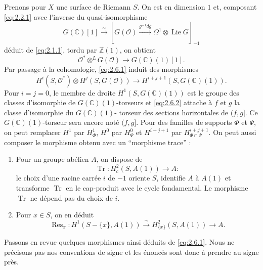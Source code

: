 \documentclass[12pt,a4paper]{article}
\theoremstyle{plain}
\theoremstyle{definition}
\theoremstyle{remark}
\DeclareMathOperator{\Res}{Res}
\DeclareMathOperator{\Tr}{Tr}
\newcommand{\cO}{\mathcal{O}}
\newcommand{\Z}{\mathbb{Z}}
\newcommand{\C}{\mathbb{C}}
\providecommand{\cO}{\mathcal{O}}
\providecommand{\Tr}{\operatorname{Tr}}
\begin{document}
Prenons pour $X$ une surface de Riemann $S$. On est en dimension $1$ et, composant \eqref{eq:2.2.1} avec l'inverse du quasi-isomorphisme
\[
G(\C)[1] \xrightarrow{\sim} [G(\cO) \xrightarrow{g^{-1}dg} \Omega^1 \otimes \operatorname{Lie} G]_{-1}
\]
déduit de \eqref{eq:2.1.1}, tordu par $\Z(1)$, on obtient
\begin{equation}\label{eq:2.6.1}
\cO^* \otimes^L G(\cO) \to G(\C)(1)[1].
\end{equation}
Par passage à la cohomologie, \eqref{eq:2.6.1} induit des morphismes
\begin{equation}\label{eq:2.6.2}
H^i(S, \cO^*) \otimes H^j(S, G(\cO)) \to H^{i+j+1}(S, G(\C)(1)).
\end{equation}
Pour $i = j = 0$, le membre de droite $H^1(S, G(\C)(1))$ est le groupe des classes d'isomorphie
de $G(\C)(1)$-torseurs et \eqref{eq:2.6.2} attache à $f$ et $g$ la classe d'isomorphie du $G(\C)(1)$-
torseur des sections horizontales de $(f,g]$. Ce $G(\C)(1)$-torseur sera encore noté $(f,g]$.
Pour des familles de supports $\Phi$ et $\Psi$, on peut remplacer $H^1$ par $H^1_\Phi$, $H^0$ par $H^0_\Psi$
et $H^{i+j+1}$ par $H^{i+j+1}_{\Phi \cap \Psi}$. On peut aussi composer le morphisme obtenu avec un ``morphisme trace'' :

\begin{enumerate}[label=(\Alph*)]
\item Pour un groupe abélien $A$, on dispose de
\begin{equation}\label{eq:2.6.3}
\Tr : H^2_c(S, A(1)) \to A :
\end{equation}
le choix d'une racine carrée $i$ de $-1$ oriente $S$, identifie $A$ à $A(1)$ et transforme $\Tr$
en le cap-produit avec le cycle fondamental. Le morphisme $\Tr$ ne dépend pas du
choix de $i$.

\item Pour $x \in S$, on en déduit
\begin{equation}\label{eq:2.6.4}
\Res_x : H^1(S - \{x\}, A(1)) \xrightarrow{\sim} H^2_{\{x\}}(S, A(1)) \to A.
\end{equation}
\end{enumerate}

Passons en revue quelques morphismes ainsi déduits de \eqref{eq:2.6.1}. Nous ne précisons
pas nos conventions de signe et les énoncés sont donc à prendre au signe près.

\subsection{}
\end{document}
